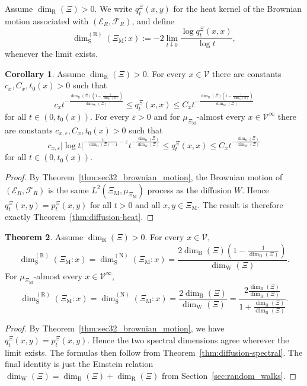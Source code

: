 \documentclass{article}
\theoremstyle{plain}
\theoremstyle{definition}
\newtheorem{theorem}{Theorem}[section]
\newtheorem{corollary}[theorem]{Corollary}
\newcommand{\dimbox}{\dim_\mathrm{B}}
\newcommand{\dimdeg}{\dim_\mathrm{D}}
\newcommand{\dimwalk}{\dim_\mathrm{W}}
\newcommand{\dimresis}{\dim_\mathrm{R}}
\newcommand{\dimspec}{\dim_\mathrm{S}}
\begin{document}
\bigskip 

Assume $\dimresis(\Xi)>0$.
We write $q_t^\Xi(x,y)$ for the heat kernel of the Brownian motion associated with $(\mathcal E_R,\mathcal F_R)$, and define
\[
\dimspec^{(\mathrm R)}(\Xi_{\mathrm M}:x)
:=
-2 \lim_{t \downarrow 0} \frac{\log q_t^\Xi(x,x)}{\log t},
\]
whenever the limit exists.

\begin{corollary}\label{cor:brownian-heat}
Assume $\dimresis(\Xi)>0$.
For every $x\in \mathscr V$ there are constants $c_x,C_x,t_0(x)>0$ such that
\[
c_x t^{-\frac{\dimbox(\Xi)\left(1-\frac{1}{\dimdeg(\Xi)}\right)}{\dimwalk(\Xi)}}
\le
q_t^\Xi(x,x)
\le
C_x t^{-\frac{\dimbox(\Xi)\left(1-\frac{1}{\dimdeg(\Xi)}\right)}{\dimwalk(\Xi)}}
\]
for all $t\in(0,t_0(x))$.
For every $\varepsilon>0$ and for $\mu_{\Xi_{\mathrm M}}$-almost every $x\in \mathscr V^\infty$ there are constants $c_{x,\varepsilon},C_x,t_0(x)>0$ such that
\[
c_{x,\varepsilon} |\log t|^{-\frac{1}{\dimdeg(\Xi)-1}-\varepsilon} t^{-\frac{\dimbox(\Xi)}{\dimwalk(\Xi)}}
\le
q_t^\Xi(x,x)
\le
C_x t^{-\frac{\dimbox(\Xi)}{\dimwalk(\Xi)}}
\]
for all $t\in(0,t_0(x))$.
\end{corollary}

\begin{proof}
By Theorem~\ref{thm:sec32_brownian_motion}, the Brownian motion of $(\mathcal E_R,\mathcal F_R)$ is the same $L^2(\Xi_{\mathrm M},\mu_{\Xi_{\mathrm M}})$ process as the diffusion $W$.
Hence $q_t^\Xi(x,y)=p_t^\Xi(x,y)$ for all $t>0$ and all $x,y\in \Xi_{\mathrm M}$.
The result is therefore exactly Theorem~\ref{thm:diffusion-heat}.
\end{proof}

\begin{theorem}\label{thm:brownian-spectral}
Assume $\dimresis(\Xi)>0$.
For every $x\in \mathscr V$,
\[
\dimspec^{(\mathrm R)}(\Xi_{\mathrm M}:x)
=
\dimspec^{(\mathrm N)}(\Xi_{\mathrm M}:x)
=
\frac{2\dimbox(\Xi)\left(1-\frac{1}{\dimdeg(\Xi)}\right)}{\dimwalk(\Xi)}.
\]
For $\mu_{\Xi_{\mathrm M}}$-almost every $x\in \mathscr V^\infty$,
\[
\dimspec^{(\mathrm R)}(\Xi_{\mathrm M}:x)
=
\dimspec^{(\mathrm N)}(\Xi_{\mathrm M}:x)
=
\frac{2\dimbox(\Xi)}{\dimwalk(\Xi)}
=
\frac{2\frac{\dimbox(\Xi)}{\dimresis(\Xi)}}{1+\frac{\dimbox(\Xi)}{\dimresis(\Xi)}}.
\]
\end{theorem}

\begin{proof}
By Theorem~\ref{thm:sec32_brownian_motion}, we have $q_t^\Xi(x,y)=p_t^\Xi(x,y)$.
Hence the two spectral dimensions agree wherever the limit exists.
The formulas then follow from Theorem~\ref{thm:diffusion-spectral}.
The final identity is just the Einstein relation $\dimwalk(\Xi)=\dimbox(\Xi)+\dimresis(\Xi)$ from Section~\ref{sec:random_walks}.
\end{proof}
\end{document}
